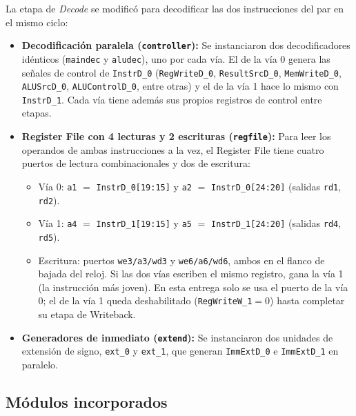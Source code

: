 \documentclass[12pt,a4paper]{article}
\begin{document}
La etapa de \textit{Decode} se modificó para decodificar las dos instrucciones del par en el mismo ciclo:
\begin{itemize}
\item \textbf{Decodificación paralela (\texttt{controller}):} Se instanciaron dos decodificadores idénticos (\texttt{maindec} y \texttt{aludec}), uno por cada vía. El de la vía 0 genera las señales de control de \texttt{InstrD\_0} (\texttt{RegWriteD\_0}, \texttt{ResultSrcD\_0}, \texttt{MemWriteD\_0}, \texttt{ALUSrcD\_0}, \texttt{ALUControlD\_0}, entre otras) y el de la vía 1 hace lo mismo con \texttt{InstrD\_1}. Cada vía tiene además sus propios registros de control entre etapas.
\item \textbf{Register File con 4 lecturas y 2 escrituras (\texttt{regfile}):} Para leer los operandos de ambas instrucciones a la vez, el Register File tiene cuatro puertos de lectura combinacionales y dos de escritura:
\begin{itemize}
\item Vía 0: \texttt{a1} $=$ \texttt{InstrD\_0[19:15]} y \texttt{a2} $=$ \texttt{InstrD\_0[24:20]} (salidas \texttt{rd1}, \texttt{rd2}).
\item Vía 1: \texttt{a4} $=$ \texttt{InstrD\_1[19:15]} y \texttt{a5} $=$ \texttt{InstrD\_1[24:20]} (salidas \texttt{rd4}, \texttt{rd5}).
\item Escritura: puertos \texttt{we3/a3/wd3} y \texttt{we6/a6/wd6}, ambos en el flanco de bajada del reloj. Si las dos vías escriben el mismo registro, gana la vía 1 (la instrucción más joven). En esta entrega solo se usa el puerto de la vía 0; el de la vía 1 queda deshabilitado (\texttt{RegWriteW\_1}$=0$) hasta completar su etapa de Writeback.
\end{itemize}
\item \textbf{Generadores de inmediato (\texttt{extend}):} Se instanciaron dos unidades de extensión de signo, \texttt{ext\_0} y \texttt{ext\_1}, que generan \texttt{ImmExtD\_0} e \texttt{ImmExtD\_1} en paralelo.
\end{itemize}

\subsection{Módulos incorporados}
\end{document}
